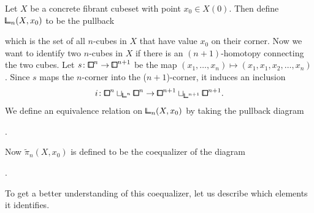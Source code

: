\begin{construction}\label{cons:structure-monoid-concrete}
Let $X$ be a concrete fibrant cubeset with point $x_0\in X(0)$.
Then define $\bbcor_n(X,x_0)$ to be the pullback
\begin{center}
\end{center}
which is the set of all $n$-cubes in $X$ that have value $x_0$ on their corner.
Now we want to identify two $n$-cubes in $X$ if there is an $(n+1)$-homotopy connecting the two cubes.
Let $s\colon{\bbox}^n\to{\bbox}^{n+1}$ be the map $(x_1,\ldots,x_n)\mapsto (x_1,x_1,x_2,\ldots,x_n)$.
Since $s$ maps the $n$-corner into the ($n+1$)-corner,
it induces an inclusion
\[
    i\colon{\bbox}^n\sqcup_{{\bbcor}^n}{\bbox}^n\to{\bbox}^{n+1}\sqcup_{{\bbcor}^{n+1}}{\bbox}^{n+1}.
\]
We define an equivalence relation on $\bbcor_n(X,x_0)$ by taking the pullback diagram
\begin{center}
.
\end{center}
Now $\tilde{\pi}_n(X,x_0)$ is defined to be the coequalizer of the diagram
\begin{center}
.
\end{center}
\end{construction}


To get a better understanding of this coequalizer, let us describe which elements it identifies.


